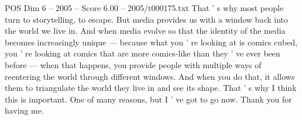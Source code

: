\begin{textsample}{POS Dim 6 – 2005 – Score 6.00 – 2005/t000175.txt}
That ' s why most people turn to storytelling, to escape.
But media provides us with a window back into the world we live in.
And when media evolve so that the identity of the media becomes increasingly unique — because what you ' re looking at is comics cubed, you ' re looking at comics that are more comics-like than they ' ve ever been before — when that happens, you provide people with multiple ways of reentering the world through different windows.
And when you do that, it allows them to triangulate the world they live in and see its shape.
That ' s why I think this is important.
One of many reasons, but I ' ve got to go now.
Thank you for having me.

\end{textsample}
